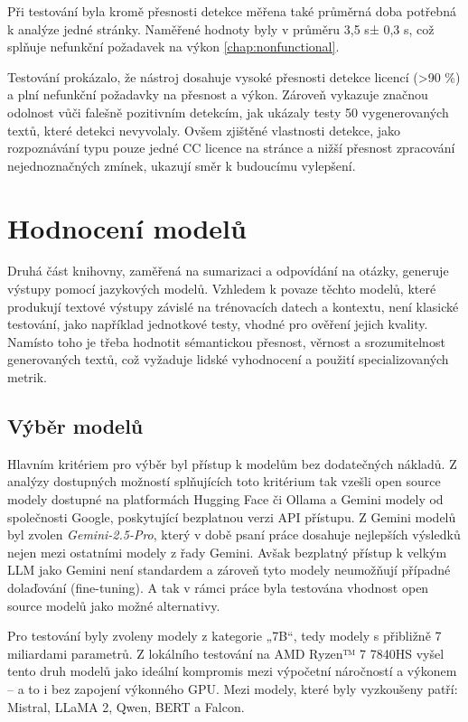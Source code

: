 Při testování byla kromě přesnosti detekce měřena také průměrná doba potřebná k analýze jedné stránky.
Naměřené hodnoty byly v průměru 3,5 s\-± 0,3 s, což splňuje nefunkční požadavek na výkon \ref{chap:nonfunctional}.

Testování prokázalo, že nástroj dosahuje vysoké přesnosti detekce licencí (>90 \%) a plní nefunkční požadavky na přesnost a výkon.
Zároveň vykazuje značnou odolnost vůči falešně pozitivním detekcím, jak ukázaly testy 50 vygenerovaných textů, které detekci nevyvolaly.
Ovšem zjištěné vlastnosti detekce, jako rozpoznávání typu pouze jedné CC licence na stránce a nižší přesnost zpracování nejednoznačných zmínek, ukazují směr k budoucímu vylepšení.

\section{Hodnocení modelů}

Druhá část knihovny, zaměřená na sumarizaci a odpovídání na otázky, generuje výstupy pomocí jazykových modelů.
Vzhledem k povaze těchto modelů, které produkují textové výstupy závislé na trénovacích datech a kontextu, není klasické testování, jako například jednotkové testy, vhodné pro ověření jejich kvality.
Namísto toho je třeba hodnotit sémantickou přesnost, věrnost a srozumitelnost generovaných textů, což vyžaduje lidské vyhodnocení a použití specializovaných metrik.

\subsection{Výběr modelů}
\label{chap:models}

Hlavním kritériem pro výběr byl přístup k modelům bez dodatečných nákladů.
Z analýzy dostupných možností splňujících toto kritérium tak vzešli open source modely dostupné na platformách Hugging Face či Ollama \cite{ollamaOllama} a Gemini modely od společnosti Google, poskytující bezplatnou verzi API přístupu.
Z Gemini modelů byl zvolen \textit{Gemini-2.5-Pro}, který v době psaní práce dosahuje nejlepších výsledků nejen mezi ostatními modely z řady Gemini. 
Avšak bezplatný přístup k velkým LLM jako Gemini není standardem a zároveň tyto modely neumožňují případné dolaďování (fine-tuning).
A tak v rámci práce byla testována vhodnost open source modelů jako možné alternativy.

Pro testování byly zvoleny modely z kategorie „7B“, tedy modely s přibližně 7 miliardami parametrů.
Z lokálního testování na AMD Ryzen™ 7 7840HS vyšel tento druh modelů jako ideální kompromis mezi výpočetní náročností a výkonem -- a to i bez zapojení výkonného GPU.
Mezi modely, které byly vyzkoušeny patří: Mistral, LLaMA 2, Qwen, BERT a Falcon.

